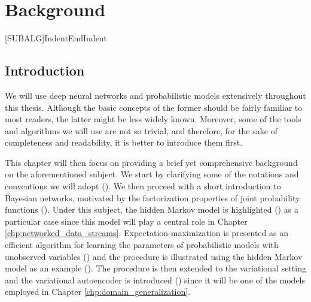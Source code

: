 
\chapter{Background}


\label{chp:background}


[SUBALG]{Indent}{EndIndent}{}{\algorithmicend\ }%

\section{Introduction}
\label{sec:background_intro}
We will use deep neural networks and probabilistic models extensively throughout this thesis. Although the basic concepts of the former should be fairly familiar to most readers, the latter might be less widely known. Moreover, some of the tools and algorithms we will use are not so trivial, and therefore, for the sake of completeness and readability, it is better to introduce them first.

This chapter will then focus on providing a brief yet comprehensive background on the aforementioned subject. We start by clarifying some of the notations and conventions we will adopt (). We then proceed with a short introduction to Bayesian networks, motivated by the factorization properties of joint probability functions (). Under this subject, the hidden Markov model is highlighted () as a particular case since this model will play a central role in Chapter \ref{chp:networked_data_streams}. Expectation-maximization is presented as an efficient algorithm for learning the parameters of probabilistic models with unobserved variables () and the procedure is illustrated using the hidden Markov model as an example (). The procedure is then extended to the variational setting and the variational autoencoder is introduced () since it will be one of the models employed in Chapter \ref{chp:domain_generalization}.

